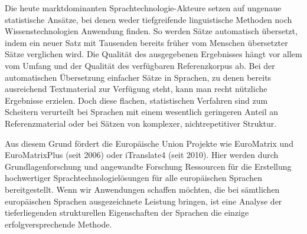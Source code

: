 \documentclass[]{../../metanetpaper}
\begin{document}
\begin{Parallel}[c]{80mm}{80mm}
{Die heute marktdominanten Sprachtechnologie-Akteure setzen auf ungenaue statistische Ansätze, bei denen weder tiefgreifende linguistische Methoden noch Wissenstechnologien Anwendung finden. So werden Sätze automatisch übersetzt, indem ein neuer Satz mit Tausenden bereits früher vom Menschen übersetzter Sätze verglichen wird. Die Qualität des ausgegebenen Ergebnisses hängt vor allem vom Umfang und der Qualität des verfügbaren Referenzkorpus ab. Bei der automatischen Übersetzung einfacher Sätze in Sprachen, zu denen bereits ausreichend Textmaterial zur Verfügung steht, kann man recht nützliche Ergebnisse erzielen. Doch diese flachen, statistischen Verfahren sind zum Scheitern verurteilt bei Sprachen mit einem wesentlich geringeren Anteil an Referenzmaterial oder bei Sätzen von komplexer, nichtrepetitiver Struktur.

Aus diesem Grund fördert die Europäische Union Projekte wie EuroMatrix und EuroMatrixPlus (seit 2006) oder iTranslate4 (seit 2010). Hier werden durch Grundlagenforschung und angewandte Forschung Ressourcen für die Erstellung hochwertiger Sprachtechnologielösungen für alle europäischen Sprachen bereitgestellt. Wenn wir Anwendungen schaffen möchten, die bei sämtlichen europäischen Sprachen ausgezeichnete Leistung bringen, ist eine Analyse der tieferliegenden strukturellen Eigenschaften der Sprachen die einzige erfolgversprechende Methode.

}
\end{Parallel}
\end{document}

